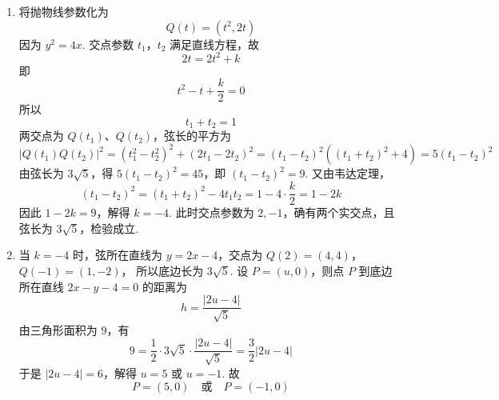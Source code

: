 \documentclass[UTF8,a4paper,oneside,11pt]{ctexbook}
\begin{document}
\begin{solution}
\begin{enumerate}
\item 将抛物线参数化为
\[
Q(t)=(t^2,2t)
\]
因为 \(y^2=4x\). 交点参数 \(t_1\)，\(t_2\) 满足直线方程，故
\[
2t=2t^2+k
\]
即
\[
t^2-t+\frac{k}{2}=0
\]
所以
\[
t_1+t_2=1
\]
两交点为 \(Q(t_1)\)、\(Q(t_2)\)，弦长的平方为
\[
\left|Q(t_1)Q(t_2)\right|^2=\left(t_1^2-t_2^2\right)^2+\left(2t_1-2t_2\right)^2=\left(t_1-t_2\right)^2\left(\left(t_1+t_2\right)^2+4\right)=5\left(t_1-t_2\right)^2
\]
由弦长为 \(3\sqrt5\)，得 \(5(t_1-t_2)^2=45\)，即 \((t_1-t_2)^2=9\). 又由韦达定理，
\[
(t_1-t_2)^2=(t_1+t_2)^2-4t_1t_2=1-4\cdot\frac{k}{2}=1-2k
\]
因此 \(1-2k=9\)，解得 \(k=-4\). 此时交点参数为 \(2,-1\)，确有两个实交点，且弦长为 \(3\sqrt5\)，检验成立.
\item 当 \(k=-4\) 时，弦所在直线为 \(y=2x-4\)，交点为
\(Q(2)=(4,4)\)，\(Q(-1)=(1,-2)\)，
所以底边长为 \(3\sqrt5\). 设 \(P=(u,0)\)，则点 \(P\) 到底边所在直线 \(2x-y-4=0\) 的距离为
\[
h=\frac{|2u-4|}{\sqrt5}
\]
由三角形面积为 \(9\)，有
\[
9=\frac12\cdot3\sqrt5\cdot\frac{|2u-4|}{\sqrt5}=\frac32|2u-4|
\]
于是 \(|2u-4|=6\)，解得 \(u=5\) 或 \(u=-1\). 故
\[
P=(5,0)\quad\text{或}\quad P=(-1,0)
\]
\end{enumerate}
\end{solution}

\end{document}
